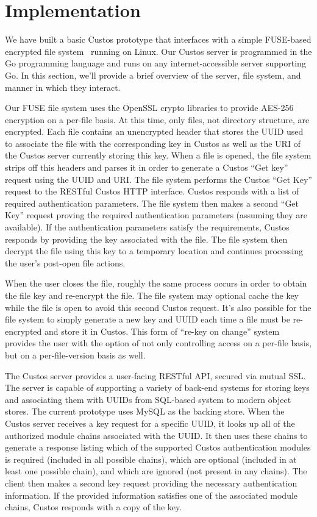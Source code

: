 \section{Implementation}
\label{sec:implementation}

We have built a basic Custos prototype that interfaces with a simple
FUSE-based encrypted file system~\cite{sayler-os-encfs} running on
Linux. Our Custos server is programmed in the Go programming language
and runs on any internet-accessible server supporting Go. In this
section, we'll provide a brief overview of the server, file system,
and manner in which they interact.

Our FUSE file system uses the OpenSSL crypto libraries to provide
AES-256 encryption on a per-file basis. At this time, only files, not
directory structure, are encrypted. Each file contains an unencrypted
header that stores the UUID used to associate the file with the
corresponding key in Custos as well as the URI of the Custos server
currently storing this key. When a file is opened, the file system
strips off this headers and parses it in order to generate a Custos
``Get key'' request using the UUID and URI. The file system performs
the Custos ``Get Key'' request to the RESTful Custos HTTP
interface. Custos responds with a list of required authentication
parameters. The file system then makes a second ``Get Key'' request
proving the required authentication parameters (assuming they are
available). If the authentication parameters satisfy the requirements,
Custos responds by providing the key associated with the file. The
file system then decrypt the file using this key to a temporary
location and continues processing the user's post-open file actions.

When the user closes the file, roughly the same process occurs in
order to obtain the file key and re-encrypt the file. The file system
may optional cache the key while the file is open to avoid this second
Custos request. It's also possible for the file system to simply
generate a new key and UUID each time a file must be re-encrypted and
store it in Custos. This form of ``re-key on change'' system provides
the user with the option of not only controlling access on a per-file
basis, but on a per-file-version basis as well.

The Custos server provides a user-facing RESTful API, secured via
mutual SSL. The server is capable of supporting a variety of back-end
systems for storing keys and associating them with UUIDs from
SQL-based system to modern object stores. The current prototype uses
MySQL as the backing store. When the Custos server receives a key
request for a specific UUID, it looks up all of the authorized module
chains associated with the UUID. It then uses these chains to generate
a response listing which of the supported Custos authentication
modules is required (included in all possible chains), which are
optional (included in at least one possible chain), and which are
ignored (not present in any chains). The client then makes a second
key request providing the necessary authentication information. If the
provided information satisfies one of the associated module chains,
Custos responds with a copy of the key.

